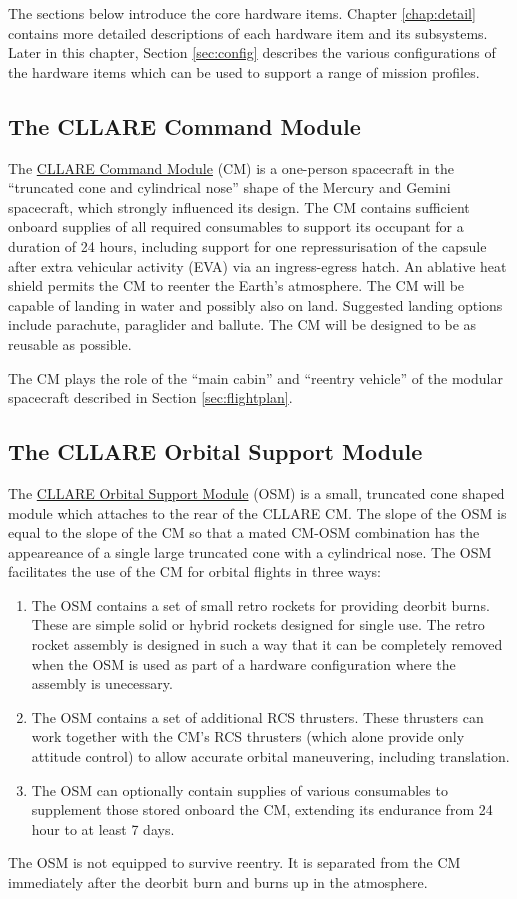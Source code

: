 \documentclass{report}
\begin{document}
The sections below introduce the core hardware items.  Chapter \ref{chap:detail} contains more detailed descriptions of each hardware item and its subsystems.  Later in this chapter, Section \ref{sec:config} describes the various configurations of the hardware items which can be used to support a range of mission profiles.

\subsection{The CLLARE Command Module}

The \href{http://cstart.org/wiki/CLLARE_Command_Module}{CLLARE Command Module} (CM) is a one-person spacecraft in the ``truncated cone and cylindrical nose'' shape of the Mercury and Gemini spacecraft, which strongly influenced its design.  The CM contains sufficient onboard supplies of all required consumables to support its occupant for a duration of 24 hours, including support for one repressurisation of the capsule after extra vehicular activity (EVA) via an ingress-egress hatch.  An ablative heat shield permits the CM to reenter the Earth's atmosphere.  The CM will be capable of landing in water and possibly also on land.  Suggested landing options include parachute, paraglider and ballute.  The CM will be designed to be as reusable as possible.

The CM plays the role of the ``main cabin'' and ``reentry vehicle'' of the modular spacecraft described in Section \ref{sec:flightplan}.

\subsection{The CLLARE Orbital Support Module}

The \href{http://cstart.org/wiki/CLLARE_Orbital_Support_Module}{CLLARE Orbital Support Module} (OSM) is a small, truncated cone shaped module which attaches to the rear of the CLLARE CM.  The slope of the OSM is equal to the slope of the CM so that a mated CM-OSM combination has the appeareance of a single large truncated cone with a cylindrical nose.  The OSM facilitates the use of the CM for orbital flights in three ways:
\begin{enumerate}
\item The OSM contains a set of small retro rockets for providing deorbit burns.  These are simple solid or hybrid rockets designed for single use.  The retro rocket assembly is designed in such a way that it can be completely removed when the OSM is used as part of a hardware configuration where the assembly is unecessary.
\item The OSM contains a set of additional RCS thrusters.  These thrusters can work together with the CM's RCS thrusters (which alone provide only attitude control) to allow accurate orbital maneuvering, including translation.
\item The OSM can optionally contain supplies of various consumables to supplement those stored onboard the CM, extending its endurance from 24 hour to at least 7 days.
\end{enumerate}
The OSM is not equipped to survive reentry.  It is separated from the CM immediately after the deorbit burn and burns up in the atmosphere.
\end{document}
